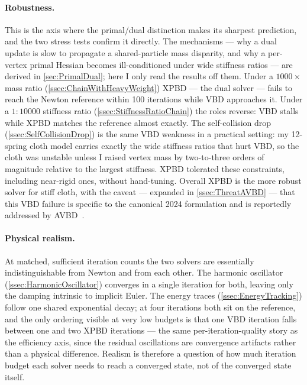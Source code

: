 \paragraph{Robustness.}
This is the axis where the primal/dual distinction makes its sharpest
prediction, and the two stress tests confirm it directly. The mechanisms ---
why a dual update is slow to propagate a shared-particle mass disparity, and
why a per-vertex primal Hessian becomes ill-conditioned under wide stiffness
ratios --- are derived in \autoref{sec:PrimalDual}; here I only read the
results off them. Under a $1000\times$ mass ratio
(\autoref{ssec:ChainWithHeavyWeight}) XPBD --- the dual solver --- fails to
reach the Newton reference within 100 iterations while VBD approaches it. Under
a $1{:}10000$ stiffness ratio (\autoref{ssec:StiffnessRatioChain}) the roles
reverse: VBD stalls while XPBD matches the reference almost exactly. The
self-collision drop (\autoref{ssec:SelfCollisionDrop}) is the same VBD weakness
in a practical setting: my 12-spring cloth model carries exactly the wide
stiffness ratios that hurt VBD, so the cloth was unstable unless I raised vertex
mass by two-to-three orders of magnitude relative to the largest stiffness.
XPBD tolerated these constraints, including near-rigid ones, without
hand-tuning. Overall XPBD is the more robust solver for stiff cloth, with the
caveat --- expanded in \autoref{ssec:ThreatAVBD} --- that this VBD failure is
specific to the canonical 2024 formulation and is reportedly addressed by
AVBD~\cite{Giles2025}.

\paragraph{Physical realism.}
At matched, sufficient iteration counts the two solvers are essentially
indistinguishable from Newton and from each other. The harmonic oscillator
(\autoref{ssec:HarmonicOscillator}) converges in a single iteration for both,
leaving only the damping intrinsic to implicit Euler. The energy traces
(\autoref{ssec:EnergyTracking}) follow one shared exponential decay; at four
iterations both sit on the reference, and the only ordering visible at very low
budgets is that one VBD iteration falls between one and two XPBD iterations ---
the same per-iteration-quality story as the efficiency axis, since the residual
oscillations are convergence artifacts rather than a physical difference.
Realism is therefore a question of how much iteration budget each solver needs to
reach a converged state, not of the converged state itself.

